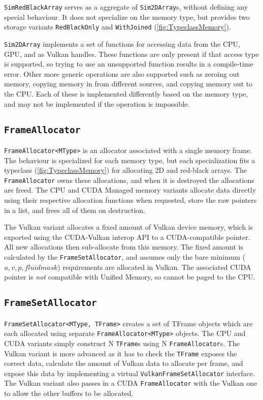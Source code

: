 \texttt{SimRedBlackArray} serves as a aggregate of \texttt{Sim2DArray}s, without defining any special behaviour.
It does not specialize on the memory type, but provides two storage variants \texttt{RedBlackOnly} and \texttt{WithJoined} (\cref{fig:TypeclassMemory}).

\texttt{Sim2DArray} implements a set of functions for accessing data from the CPU, GPU, and as Vulkan handles.
These functions are only present if that access type is supported, so trying to use an unsupported function results in a compile-time error.
Other more generic operations are also supported such as zeroing out memory, copying memory in from different sources, and copying memory out to the CPU.
Each of these is implemented differently based on the memory type, and may not be implemented if the operation is impossible.

\subsection{\texttt{FrameAllocator}}
\texttt{FrameAllocator<MType>} is an allocator associated with a single memory frame.
The behaviour is specialized for each memory type, but each specialization fits a typeclass (\cref{fig:TypeclassMemory}) for allocating 2D and red-black arrays.
The \texttt{FrameAllocator} owns these allocations, and when it is destroyed the allocations are freed.
The CPU and CUDA Managed memory variants allocate data directly using their respective allocation functions when requested, store the raw pointers in a list, and frees all of them on destruction.

The Vulkan variant allocates a fixed amount of Vulkan device memory, which is exported using the CUDA-Vulkan interop API to a CUDA-compatible pointer.
All new allocations then sub-allocate from this memory.
The fixed amount is calculated by the \texttt{FrameSetAllocator}, and assumes only the bare minimum ($u, v, p, fluidmask$) requirements are allocated in Vulkan.
The associated CUDA pointer is \emph{not} compatible with Unified Memory, so cannot be paged to the CPU.

\subsection{\texttt{FrameSetAllocator}}
\texttt{FrameSetAllocator<MType, TFrame>} creates a set of TFrame objects which are each allocated using separate \texttt{FrameAllocator<MType>} objects.
The CPU and CUDA variants simply construct N \texttt{TFrame}s using N \texttt{FrameAllocator}s.
The Vulkan variant is more advanced as it has to check the \texttt{TFrame} exposes the correct data, calculate the amount of Vulkan data to allocate per frame, and expose this data by implementing a virtual \texttt{VulkanFrameSetAllocator} interface.
The Vulkan variant also passes in a CUDA \texttt{FrameAllocator} with the Vulkan one to allow the other buffers to be allocated.

